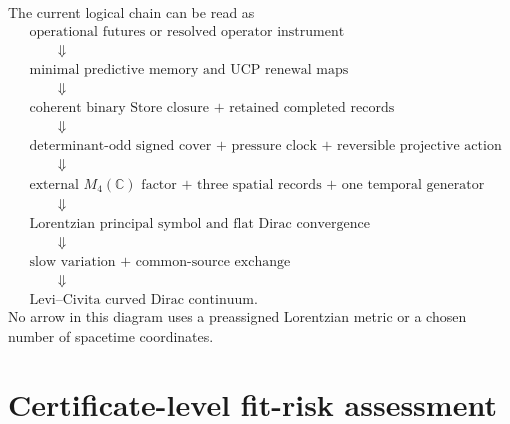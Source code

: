 \documentclass[11pt]{article}
\theoremstyle{definition}
\theoremstyle{remark}
\newcommand{\C}{\mathbb C}
\begin{document}
The current logical chain can be read as
\[
\begin{aligned}
&\text{operational futures or resolved operator instrument}
\\[-1mm]
&\qquad\Downarrow
\\[-1mm]
&\text{minimal predictive memory and UCP renewal maps}
\\[-1mm]
&\qquad\Downarrow
\\[-1mm]
&\text{coherent binary Store closure + retained completed records}
\\[-1mm]
&\qquad\Downarrow
\\[-1mm]
&\text{determinant-odd signed cover + pressure clock + reversible projective action}
\\[-1mm]
&\qquad\Downarrow
\\[-1mm]
&\text{external }M_4(\C)\text{ factor + three spatial records + one temporal generator}
\\[-1mm]
&\qquad\Downarrow
\\[-1mm]
&\text{Lorentzian principal symbol and flat Dirac convergence}
\\[-1mm]
&\qquad\Downarrow
\\[-1mm]
&\text{slow variation + common-source exchange}
\\[-1mm]
&\qquad\Downarrow
\\[-1mm]
&\text{Levi--Civita curved Dirac continuum.}
\end{aligned}
\]
No arrow in this diagram uses a preassigned Lorentzian metric or a
chosen number of spacetime coordinates.

\section{Certificate-level fit-risk assessment}
\label{sec:fit-risk}
\end{document}

